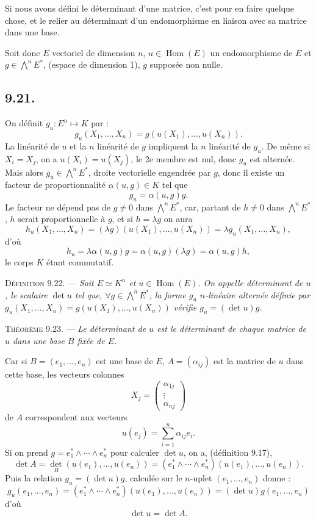 Si nous avons défini le déterminant d'une matrice, c'est pour en faire quelque chose, et le relier au déterminant d'un endomorphisme en liaison avec sa matrice dans une base.

Soit donc $E$ vectoriel de dimension $n$, $u\in\operatorname{Hom}(E)$ un endomorphisme de $E$ et $g\in\bigwedge^nE^*$, (espace de dimension 1), $g$ supposée non nulle.

\subsection*{9.21.}
On définit $g_u:E^n\longmapsto K$ par :
\[
g_u(X_1,\ldots,X_n)=g(u(X_1),\ldots,u(X_n)).
\]
La linéarité de $u$ et la $n$ linéarité de $g$ impliquent la $n$ linéarité de $g_u$. De même si $X_i=X_j$, on a $u(X_i)=u(X_j)$, le 2e membre est nul, donc $g_u$ est alternée. Mais alors $g_u\in\bigwedge^nE^*$, droite vectorielle engendrée par $g$, donc il existe un facteur de proportionnalité $\alpha(u,g)\in K$ tel que
\[
g_u=\alpha(u,g)g.
\]
Le facteur ne dépend pas de $g\ne0$ dans $\bigwedge^nE^*$, car, partant de $h\ne0$ dans $\bigwedge^nE^*$, $h$ serait proportionnelle à $g$, et si $h=\lambda g$ on aura
\[
h_u(X_1,\ldots,X_n)=(\lambda g)(u(X_1),\ldots,u(X_n))=\lambda g_u(X_1,\ldots,X_n),
\]
d'où
\[
h_u=\lambda\alpha(u,g)g=\alpha(u,g)(\lambda g)=\alpha(u,g)h,
\]
le corps $K$ étant commutatif.

\medskip\noindent\textsc{Définition 9.22.} --- \emph{Soit $E\simeq K^n$ et $u\in\operatorname{Hom}(E)$. On appelle déterminant de $u$, le scalaire $\det u$ tel que, $\forall g\in\bigwedge^nE^*$, la forme $g_u$ $n$-linéaire alternée définie par $g_u(X_1,\ldots,X_n)=g(u(X_1),\ldots,u(X_n))$ vérifie $g_u=(\det u)g$.}

\medskip\noindent\textsc{Théorème 9.23.} --- \emph{Le déterminant de $u$ est le déterminant de chaque matrice de $u$ dans une base $B$ fixée de $E$.}

Car si $B=(e_1,\ldots,e_n)$ est une base de $E$, $A=(\alpha_{ij})$ est la matrice de $u$ dans cette base, les vecteurs colonnes
\[
X_j=\begin{pmatrix}\alpha_{1j}\\ \vdots\\ \alpha_{nj}\end{pmatrix}
\]
de $A$ correspondent aux vecteurs
\[
u(e_j)=\sum_{i=1}^n\alpha_{ij}e_i.
\]
Si on prend $g=e_1^*\wedge\cdots\wedge e_n^*$ pour calculer $\det u$, on a, (définition 9.17),
\[
\det A=\det_B(u(e_1),\ldots,u(e_n))=(e_1^*\wedge\cdots\wedge e_n^*)(u(e_1),\ldots,u(e_n)).
\]
Puis la relation $g_u=(\det u)g$, calculée sur le $n$-uplet $(e_1,\ldots,e_n)$ donne :
\[
g_u(e_1,\ldots,e_n)=(e_1^*\wedge\cdots\wedge e_n^*)(u(e_1),\ldots,u(e_n))
=(\det u)g(e_1,\ldots,e_n)
\]
d'où
\[
\det u=\det A.
\]
\bookend

